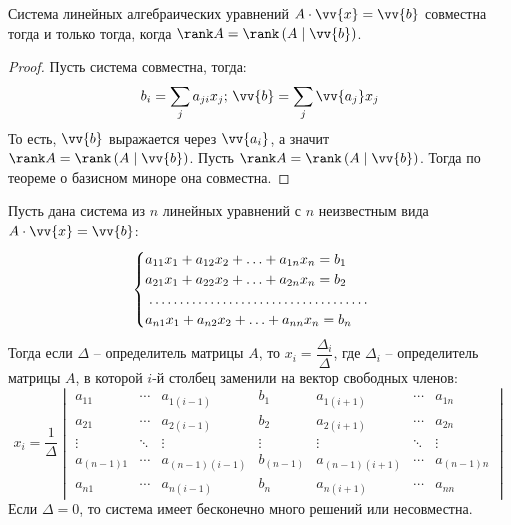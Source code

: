 \documentclass[12pt]{article}
\begin{document}
\begin{theorem}
    Система линейных алгебраических уравнений $A\cdot \vv{x}=\vv{b}$ совместна тогда и только тогда, когда $\rank A=\rank\left(A\mid \vv{b}\right)$.
\end{theorem}
\begin{proof}
    Пусть система совместна, тогда:
    $$b_i=\sum_{j}a_{ji}x_j;\, \vv{b}=\sum_{j}\vv{a_j}x_j$$
    То есть, $\vv{b}$ выражается через $\vv{a_i}$, а значит $\rank A=\rank\left(A\mid \vv{b}\right)$.
    Пусть $\rank A=\rank\left(A\mid \vv{b}\right)$. Тогда по теореме о базисном миноре она совместна.
\end{proof}
\begin{theorem}
    Пусть дана система из $n$ линейных уравнений с $n$ неизвестным вида $A\cdot \vv{x}=\vv{b}$:
    $$\begin{cases}
        a_{11}x_1 + a_{12}x_2 + \ldots + a_{1n}x_n = b_1\\
        a_{21}x_1 + a_{22}x_2 + \ldots + a_{2n}x_n = b_2\\
        \makebox[57mm]{\dotfill}\\
        a_{n1}x_1 + a_{n2}x_2 + \ldots + a_{nn}x_n = b_n
    \end{cases}$$
    Тогда если $\Delta$ – определитель матрицы $A$, то $x_i=\dfrac{\Delta_i}{\Delta}$, где $\Delta_i$ – определитель матрицы $A$, в которой $i$-й столбец заменили на вектор свободных членов:
    $$x_i=\frac{1}{\Delta}\begin{vmatrix}
        a_{11} & \cdots & a_{1(i-1)} & b_1 & a_{1(i+1)} & \cdots & a_{1n}\\
        a_{21} & \cdots & a_{2(i-1)} & b_2 & a_{2(i+1)} & \cdots & a_{2n}\\
        \vdots & \ddots & \vdots & \vdots & \vdots & \ddots & \vdots\\
        a_{(n-1)1} & \cdots & a_{(n-1)(i-1)} & b_{(n-1)} & a_{(n-1)(i+1)} & \cdots & a_{(n-1)n}\\
        a_{n1} & \cdots & a_{n(i-1)} & b_n & a_{n(i+1)} & \cdots & a_{nn}
    \end{vmatrix}$$
    Если $\Delta=0$, то система имеет бесконечно много решений или несовместна.
\end{theorem}
\end{document}
